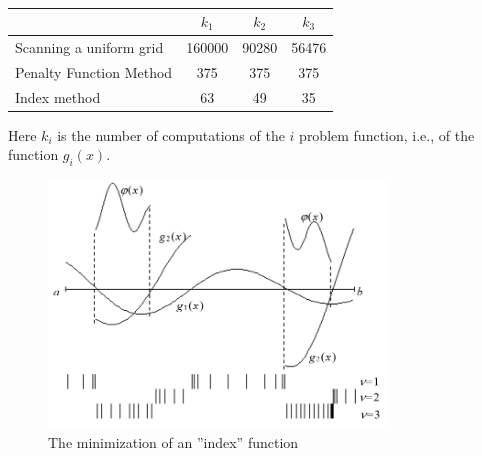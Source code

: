 \documentclass[graybox]{svmult}
\begin{document}
\begin{table}
  \caption{}
\begin{center}
  \label{tab4:exp_results}
  \begin{tabular}{| l | c | c | c| }
    \hline
    & $k_1$ & $k_2$ & $k_3$ \\ \hline
    Scanning a uniform grid & 160000 & 90280 & 56476 \\ \hline
    Penalty Function Method &  375 & 375 & 375 \\ \hline
    Index method & 63 & 49 & 35 \\ \hline
  \end{tabular}
\end{center}
\end{table}

Here $k_i$ is the number of computations of the $i$ problem function, i.e., of the function $g_i(x )$.
\begin{figure}[h]
  \label{fig:4_6}
  \centering
  \includegraphics[width=0.8\textwidth]{figures/4_6.png}
  \caption{The minimization of an ''index'' function}
\end{figure}
\end{document}
